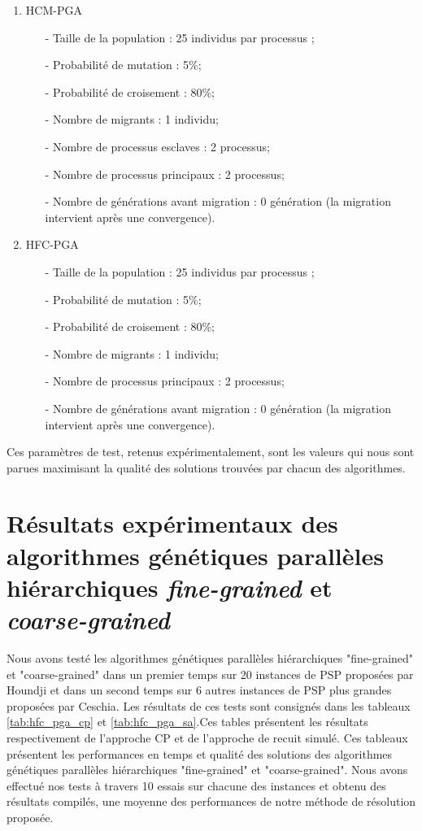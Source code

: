 		\begin{enumerate}
			\item HCM-PGA \\
				\begin{itemize}
					\item[-] Taille de la population : 25 individus par processus ;
			        \item[-] Probabilité de mutation : 5\%;
			        \item[-] Probabilité de croisement : 80\%;
			        \item[-] Nombre de migrants : 1 individu;
		 	        \item[-] Nombre de processus esclaves : 2 processus;
			        \item[-] Nombre de processus principaux : 2 processus;
			        \item[-] Nombre de générations avant migration : 0 génération (la migration intervient après une convergence).
				\end{itemize}
				\vspace*{.5cm}
			\item HFC-PGA \\
				\begin{itemize}
					\item[-] Taille de la population : 25 individus par processus ;
			        \item[-] Probabilité de mutation : 5\%;
			        \item[-] Probabilité de croisement : 80\%;
			        \item[-] Nombre de migrants : 1 individu;
			        \item[-] Nombre de processus principaux : 2 processus;
			        \item[-] Nombre de générations avant migration : 0 génération (la migration intervient après une convergence).
				\end{itemize}
		\end{enumerate}
		Ces paramètres de test, retenus expérimentalement, sont les valeurs qui nous sont parues maximisant la qualité des solutions trouvées par chacun des algorithmes.		
		
		\section{Résultats expérimentaux des algorithmes génétiques parallèles hiérarchiques \emph{fine-grained} et \emph{coarse-grained}}
		Nous avons testé les algorithmes génétiques parallèles hiérarchiques "fine-grained" et "coarse-grained" dans un premier temps sur 20 instances de PSP proposées par Houndji et dans un second temps sur 6 autres instances de PSP plus grandes proposées par Ceschia. Les résultats de ces tests sont consignés dans les tableaux \ref{tab:hfc_pga_cp} et \ref{tab:hfc_pga_sa}.Ces tables présentent les résultats respectivement de l'approche CP et de l'approche de recuit simulé. Ces tableaux présentent les performances en temps et qualité des solutions des algorithmes génétiques parallèles hiérarchiques "fine-grained" et "coarse-grained". Nous avons effectué nos tests à travers 10 essais sur chacune des instances et obtenu des résultats compilés, une moyenne des performances de notre méthode de résolution proposée.
		
